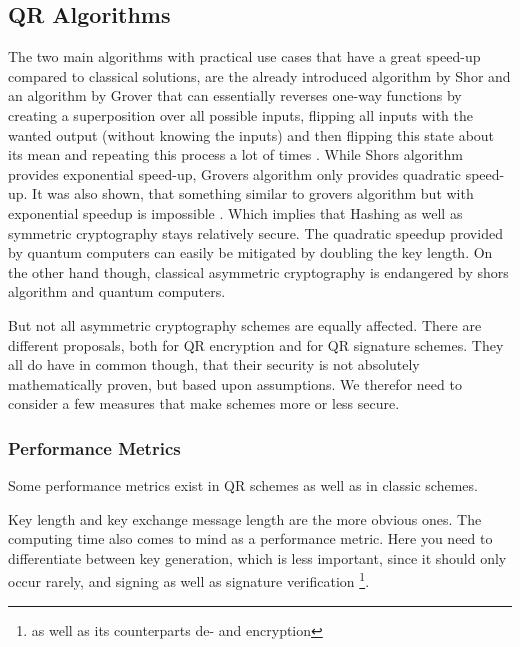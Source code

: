\documentclass[conference]{IEEEtran}
\newcommand{\comment}[1]{}
\begin{document}
\subsection{QR Algorithms}\label{l:qr-algs}
The two main algorithms with practical use cases that have a great speed-up compared to classical solutions, are the already introduced algorithm by Shor and an algorithm by Grover that can essentially reverses one-way functions by creating a superposition over all possible inputs, flipping all inputs with the wanted output (without knowing the inputs) and then flipping this state about its mean and repeating this process a lot of times \cite{Grover}.
While Shors algorithm provides exponential speed-up, Grovers algorithm only provides quadratic speed-up. It was also shown, that something similar to grovers algorithm but with exponential speedup is impossible \cite{Strengths&Weaknesses_QC}. 
Which implies that Hashing as well as symmetric cryptography stays relatively secure.
The quadratic speedup provided by quantum computers can easily be mitigated by doubling the key length.
On the other hand though, classical asymmetric cryptography is endangered by shors algorithm and quantum computers.

But not all asymmetric cryptography schemes are equally affected.
There are different proposals, both for QR encryption and for QR signature schemes.
They all do have in common though, that their security is not absolutely mathematically proven, but based upon assumptions.
We therefor need to consider a few measures that make schemes more or less secure.
\subsubsection{Performance Metrics}
\comment{ %
    - Security Level (1-5, AES-128, SHA256, AES-192, SHA384, AES-256) \cite{QR_Iot_Lattice,Energy_comp}([7]) determined via grovers alg
    - no standard benchmark for quantum resistance \cite{QR_comparison} (NIST levels 1-5)
} %

Some performance metrics exist in QR schemes as well as in classic schemes.

Key length and key exchange message length \cite{QR_algs} are the more obvious ones.
The computing time also comes to mind as a performance metric. Here you need to differentiate between key generation, which is less important, since it should only occur rarely, and signing as well as signature verification \footnote{as well as its counterparts de- and encryption}.
\end{document}
